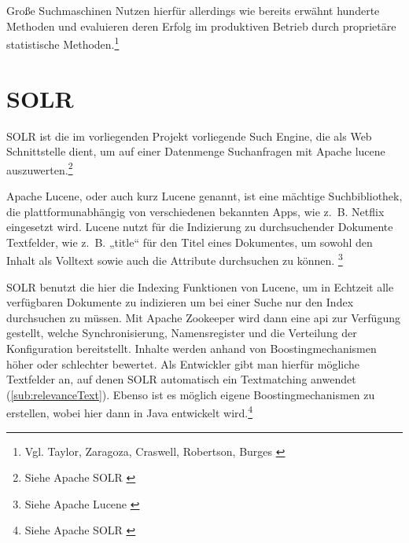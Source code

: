 Große Suchmaschinen Nutzen hierfür allerdings wie bereits erwähnt hunderte Methoden und evaluieren deren Erfolg im produktiven Betrieb durch proprietäre statistische Methoden.\footnote{Vgl. Taylor, Zaragoza, Craswell, Robertson, Burges \cite{taylor2006}}

\section{SOLR}
\label{sec:SOLR}
SOLR ist die im vorliegenden Projekt vorliegende Such Engine, die als Web Schnittstelle dient, um auf einer Datenmenge Suchanfragen mit Apache \gls{lucene} auszuwerten.\footnote{Siehe Apache SOLR \cite{solr2022}}

Apache Lucene, oder auch kurz Lucene genannt, ist eine mächtige Suchbibliothek, die plattformunabhängig von verschiedenen bekannten Apps, wie z. B. Netflix eingesetzt wird.
Lucene nutzt für die Indizierung zu durchsuchender Dokumente Textfelder, wie z. B. „title“ für den Titel eines Dokumentes, um sowohl den Inhalt als Volltext sowie auch die Attribute durchsuchen zu können. \footnote{Siehe Apache Lucene \cite{lucene2022}}

SOLR benutzt die hier die Indexing Funktionen von Lucene, um in Echtzeit alle verfügbaren Dokumente zu indizieren um bei einer Suche nur den Index durchsuchen zu müssen.
Mit Apache Zookeeper wird dann eine \gls{api} zur Verfügung gestellt, welche Synchronisierung, Namensregister und die Verteilung der Konfiguration bereitstellt.
Inhalte werden anhand von Boostingmechanismen höher oder schlechter bewertet.
Als Entwickler gibt man hierfür mögliche Textfelder an, auf denen SOLR automatisch ein Textmatching anwendet (\ref{sub:relevanceText}).
Ebenso ist es möglich eigene Boostingmechanismen zu erstellen, wobei hier dann in Java entwickelt wird.\footnote{Siehe Apache SOLR \cite{solr2022}}
